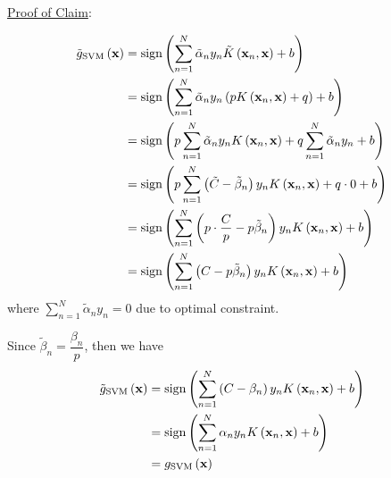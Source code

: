 \documentclass[12pt]{article}
\newcommand{\ParTh}[1]{\left(#1\right)}
\newcommand{\BF}[1]{{\bf#1}}
\begin{document}
\underline{Proof of Claim}:

\begin{align}
\tilde{g}_{\text{SVM}}\ParTh{\BF{x}}&=\text{sign}\ParTh{\sum_{n=1}^{N}\tilde{\alpha}_ny_n\tilde{K}\ParTh{\BF{x}_n,\BF{x}}+b}\\
&=\text{sign}\ParTh{\sum_{n=1}^{N}\tilde{\alpha}_ny_n\ParTh{pK\ParTh{\BF{x}_n,\BF{x}}+q}+b}\\
&=\text{sign}\ParTh{p\sum_{n=1}^{N}\tilde{\alpha}_ny_nK\ParTh{\BF{x}_n,\BF{x}}+q\sum_{n=1}^{N}\tilde{\alpha}_ny_n+b}\\
&=\text{sign}\ParTh{p\sum_{n=1}^{N}\ParTh{\tilde{C}-\tilde{\beta}_n}y_nK\ParTh{\BF{x}_n,\BF{x}}+q\cdot0+b}\\
&=\text{sign}\ParTh{\sum_{n=1}^{N}\ParTh{p\cdot\dfrac{C}{p}-p\tilde{\beta}_n}y_nK\ParTh{\BF{x}_n,\BF{x}}+b}\\
&=\text{sign}\ParTh{\sum_{n=1}^{N}\ParTh{C-p\tilde{\beta}_n}y_nK\ParTh{\BF{x}_n,\BF{x}}+b}
\end{align}
where $\sum_{n=1}^{N}\tilde{\alpha}_ny_n=0$ due to optimal constraint.

Since $\tilde{\beta}_n=\dfrac{\beta_n}{p}$, then we have
\begin{align}
\tilde{g}_{\text{SVM}}\ParTh{\BF{x}}&=\text{sign}\ParTh{\sum_{n=1}^{N}\ParTh{C-\beta_n}y_nK\ParTh{\BF{x}_n,\BF{x}}+b}\\
&=\text{sign}\ParTh{\sum_{n=1}^{N}\alpha_ny_nK\ParTh{\BF{x}_n,\BF{x}}+b}\\
&=g_{\text{SVM}}\ParTh{\BF{x}}
\end{align}
\end{document}
